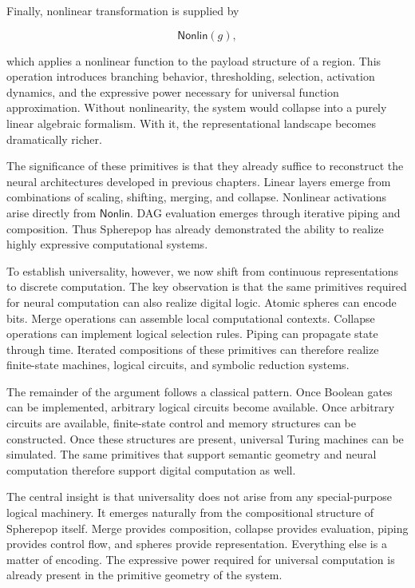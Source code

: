 \documentclass[12pt,letterpaper]{article}
\theoremstyle{remark}
\begin{document}
Finally, nonlinear transformation is supplied by

\[
\mathsf{Nonlin}(g),
\]

which applies a nonlinear function to the payload structure of a region. This operation introduces branching behavior, thresholding, selection, activation dynamics, and the expressive power necessary for universal function approximation. Without nonlinearity, the system would collapse into a purely linear algebraic formalism. With it, the representational landscape becomes dramatically richer.

The significance of these primitives is that they already suffice to reconstruct the neural architectures developed in previous chapters. Linear layers emerge from combinations of scaling, shifting, merging, and collapse. Nonlinear activations arise directly from $\mathsf{Nonlin}$. DAG evaluation emerges through iterative piping and composition. Thus Spherepop has already demonstrated the ability to realize highly expressive computational systems.

To establish universality, however, we now shift from continuous representations to discrete computation. The key observation is that the same primitives required for neural computation can also realize digital logic. Atomic spheres can encode bits. Merge operations can assemble local computational contexts. Collapse operations can implement logical selection rules. Piping can propagate state through time. Iterated compositions of these primitives can therefore realize finite-state machines, logical circuits, and symbolic reduction systems.

The remainder of the argument follows a classical pattern. Once Boolean gates can be implemented, arbitrary logical circuits become available. Once arbitrary circuits are available, finite-state control and memory structures can be constructed. Once these structures are present, universal Turing machines can be simulated. The same primitives that support semantic geometry and neural computation therefore support digital computation as well.

The central insight is that universality does not arise from any special-purpose logical machinery. It emerges naturally from the compositional structure of Spherepop itself. Merge provides composition, collapse provides evaluation, piping provides control flow, and spheres provide representation. Everything else is a matter of encoding. The expressive power required for universal computation is already present in the primitive geometry of the system.
\end{document}
